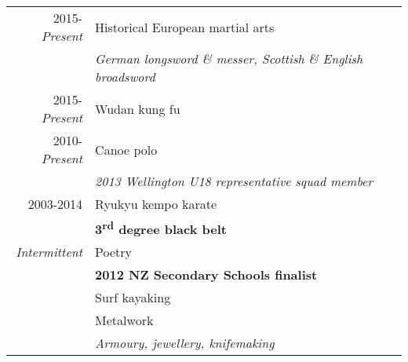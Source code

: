 \documentclass[a4paper,10pt]{article} %
\begin{document}
\begin{tabular}{rl}

2015-\emph{Present} & Historical European martial arts \\
& \quad \small\emph{German longsword  \& messer, Scottish \& English broadsword} \\

2015-\emph{Present} & Wudan kung fu \\

2010-\emph{Present} & Canoe polo \\
& \quad \small\emph{2013 Wellington U18 representative squad member} \\

2003-2014 & Ryukyu kempo karate \\
& \quad \small\textbf{3\textsuperscript{rd} degree black belt} \\

\emph{Intermittent} & Poetry \\
& \quad \small\textbf{2012 NZ Secondary Schools finalist} \\
& Surf kayaking \\
& Metalwork \\
& \quad \small\emph{Armoury, jewellery, knifemaking}





	
\end{tabular}

\end{document}
